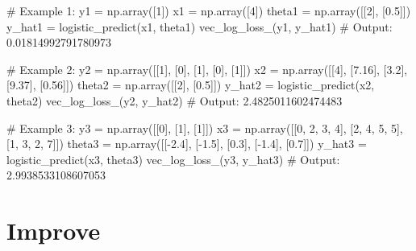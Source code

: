\documentclass[]{article}
\newenvironment{Shaded}{\begin{snugshade}}{\end{snugshade}}
\newcommand{\CommentTok}[1]{\textcolor[rgb]{0.48,0.49,0.49}{#1}}
\newcommand{\DecValTok}[1]{\textcolor[rgb]{0.96,0.45,0.00}{#1}}
\newcommand{\FloatTok}[1]{\textcolor[rgb]{0.96,0.45,0.00}{#1}}
\newcommand{\NormalTok}[1]{\textcolor[rgb]{0.81,0.81,0.76}{#1}}
\newcommand{\OperatorTok}[1]{\textcolor[rgb]{0.81,0.81,0.76}{#1}}
\begin{document}
\begin{Shaded}
\begin{Highlighting}[]
\CommentTok{# Example 1:}
\NormalTok{y1 }\OperatorTok{=}\NormalTok{ np.array([}\DecValTok{1}\NormalTok{])}
\NormalTok{x1 }\OperatorTok{=}\NormalTok{ np.array([}\DecValTok{4}\NormalTok{])}
\NormalTok{theta1 }\OperatorTok{=}\NormalTok{ np.array([[}\DecValTok{2}\NormalTok{], [}\FloatTok{0.5}\NormalTok{]])}
\NormalTok{y_hat1 }\OperatorTok{=}\NormalTok{ logistic_predict(x1, theta1)}
\NormalTok{vec_log_loss_(y1, y_hat1)}
\CommentTok{# Output:}
\FloatTok{0.01814992791780973}

\CommentTok{# Example 2:}
\NormalTok{y2 }\OperatorTok{=}\NormalTok{ np.array([[}\DecValTok{1}\NormalTok{], [}\DecValTok{0}\NormalTok{], [}\DecValTok{1}\NormalTok{], [}\DecValTok{0}\NormalTok{], [}\DecValTok{1}\NormalTok{]])}
\NormalTok{x2 }\OperatorTok{=}\NormalTok{ np.array([[}\DecValTok{4}\NormalTok{], [}\FloatTok{7.16}\NormalTok{], [}\FloatTok{3.2}\NormalTok{], [}\FloatTok{9.37}\NormalTok{], [}\FloatTok{0.56}\NormalTok{]])}
\NormalTok{theta2 }\OperatorTok{=}\NormalTok{ np.array([[}\DecValTok{2}\NormalTok{], [}\FloatTok{0.5}\NormalTok{]])}
\NormalTok{y_hat2 }\OperatorTok{=}\NormalTok{ logistic_predict(x2, theta2)}
\NormalTok{vec_log_loss_(y2, y_hat2)}
\CommentTok{# Output:}
\FloatTok{2.4825011602474483}

\CommentTok{# Example 3:}
\NormalTok{y3 }\OperatorTok{=}\NormalTok{ np.array([[}\DecValTok{0}\NormalTok{], [}\DecValTok{1}\NormalTok{], [}\DecValTok{1}\NormalTok{]])}
\NormalTok{x3 }\OperatorTok{=}\NormalTok{ np.array([[}\DecValTok{0}\NormalTok{, }\DecValTok{2}\NormalTok{, }\DecValTok{3}\NormalTok{, }\DecValTok{4}\NormalTok{], [}\DecValTok{2}\NormalTok{, }\DecValTok{4}\NormalTok{, }\DecValTok{5}\NormalTok{, }\DecValTok{5}\NormalTok{], [}\DecValTok{1}\NormalTok{, }\DecValTok{3}\NormalTok{, }\DecValTok{2}\NormalTok{, }\DecValTok{7}\NormalTok{]])}
\NormalTok{theta3 }\OperatorTok{=}\NormalTok{ np.array([[}\OperatorTok{-}\FloatTok{2.4}\NormalTok{], [}\OperatorTok{-}\FloatTok{1.5}\NormalTok{], [}\FloatTok{0.3}\NormalTok{], [}\OperatorTok{-}\FloatTok{1.4}\NormalTok{], [}\FloatTok{0.7}\NormalTok{]])}
\NormalTok{y_hat3 }\OperatorTok{=}\NormalTok{ logistic_predict(x3, theta3)}
\NormalTok{vec_log_loss_(y3, y_hat3)}
\CommentTok{# Output:}
\FloatTok{2.9938533108607053}
\end{Highlighting}
\end{Shaded}

\clearpage

\hypertarget{improve}{%
\section{Improve}\label{improve}}
\end{document}
